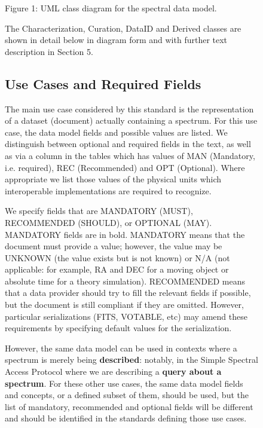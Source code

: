 \documentclass[11pt]{article}
\begin{document}
\begin{figure}[h]



\colorbox{iblue}{
}



{
\colorbox{iblue}{
\begin{minipage}{6.0in}
Figure 1: 
UML class diagram for the spectral data model.

The Characterization, Curation, DataID and Derived classes are 
shown in detail below in diagram form and
with further text description in Section 5.

\subsection{Use Cases and Required Fields}

The main use case considered by this standard is the representation
of a dataset (document) actually containing a spectrum.  For this use case,
the data model fields and possible values
are listed. We distinguish between optional and required fields in the
text, as well as via a 
column in the tables which has values of MAN (Mandatory, i.e. required),
REC (Recommended) and OPT (Optional).
Where appropriate we list those values of the physical units which interoperable
implementations are required to recognize.

We specify fields that are MANDATORY (MUST), RECOMMENDED (SHOULD), or
OPTIONAL (MAY).
MANDATORY fields are
in bold. MANDATORY means that the document must provide a value; however,
the value may be UNKNOWN (the value exists but is not known) or N/A
(not applicable: for example, RA and DEC for a moving object or
absolute time for a theory simulation). RECOMMENDED means that
a data provider should try to fill the relevant fields if possible,
but the document is still compliant if they are omitted.
However, particular serializations (FITS, VOTABLE, etc) may 
amend these requirements by specifying default values for the
serialization.


However, the same data model can be used in contexts where a spectrum is
merely being {\bf described}: notably, in the Simple Spectral Access
Protocol where we are describing a {\bf query about a spectrum}. For
these other use cases, the same data model fields and concepts, or a
defined subset of them, should be used, but the list of mandatory,
recommended and optional fields will be different and should be
identified in the standards defining those use cases.


\end{minipage}}}
\end{figure}
\end{document}
